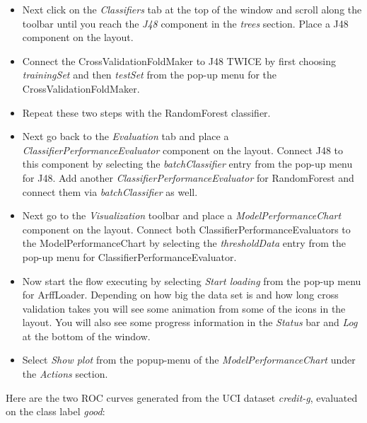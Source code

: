 \documentclass[a4paper]{article}
\begin{document}
\begin{itemize}
	\item Next click on the \textit{Classifiers} tab at the top of the window and
	scroll along the toolbar until you reach the \textit{J48} component in the
	\textit{trees} section. Place a J48 component on the layout.

	\item Connect the CrossValidationFoldMaker to J48 TWICE by first choosing
	\textit{trainingSet} and then \textit{testSet} from the pop-up menu for the
	CrossValidationFoldMaker.

	\item Repeat these two steps with the RandomForest classifier.

	\item Next go back to the \textit{Evaluation} tab and place a
	\textit{ClassifierPerformanceEvaluator} component on the layout. Connect J48
	to this component by selecting the \textit{batchClassifier} entry from the
	pop-up menu for J48. Add another \textit{ClassifierPerformanceEvaluator} for
	RandomForest and connect them via \textit{batchClassifier} as well.

	\item Next go to the \textit{Visualization} toolbar and place a 
	\textit{ModelPerformanceChart} component on the layout. Connect both 
	ClassifierPerformanceEvaluators to the ModelPerformanceChart by selecting 
	the \textit{thresholdData} entry from the pop-up menu for ClassifierPerformanceEvaluator.

	\item Now start the flow executing by selecting \textit{Start loading} from the
	pop-up menu for ArffLoader. Depending on how big the data set is and
	how long cross validation takes you will see some animation from some
	of the icons in the layout. You will also see some progress information in the 
	\textit{Status} bar and \textit{Log} at the bottom of the window.
	
	\item Select \textit{Show plot} from the popup-menu of the 
	\textit{ModelPerformanceChart} under the \textit{Actions} section.
\end{itemize}

Here are the two ROC curves generated from the UCI dataset \textit{credit-g}, 
evaluated on the class label \textit{good}:

\begin{center}
\end{center}
\end{document}
